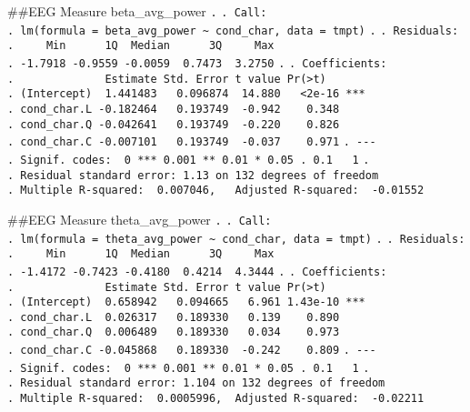 \documentclass[
]{article}
\begin{document}
\#\#EEG Measure beta\_avg\_power \texttt{.} \texttt{.\ Call:}
\texttt{.\ lm(formula\ =\ beta\_avg\_power\ \textasciitilde{}\ cond\_char,\ data\ =\ tmpt)}
\texttt{.} \texttt{.\ Residuals:}
\texttt{.\ \ \ \ \ Min\ \ \ \ \ \ 1Q\ \ Median\ \ \ \ \ \ 3Q\ \ \ \ \ Max}
\texttt{.\ -1.7918\ -0.9559\ -0.0059\ \ 0.7473\ \ 3.2750} \texttt{.}
\texttt{.\ Coefficients:}
\texttt{.\ \ \ \ \ \ \ \ \ \ \ \ \ \ Estimate\ Std.\ Error\ t\ value\ Pr(\textgreater{}\textbar{}t\textbar{})}
\texttt{.\ (Intercept)\ \ 1.441483\ \ \ 0.096874\ \ 14.880\ \ \ \textless{}2e-16\ ***}
\texttt{.\ cond\_char.L\ -0.182464\ \ \ 0.193749\ \ -0.942\ \ \ \ 0.348}
\texttt{.\ cond\_char.Q\ -0.042641\ \ \ 0.193749\ \ -0.220\ \ \ \ 0.826}
\texttt{.\ cond\_char.C\ -0.007101\ \ \ 0.193749\ \ -0.037\ \ \ \ 0.971}
\texttt{.\ -\/-\/-}
\texttt{.\ Signif.\ codes:\ \ 0\ \textquotesingle{}***\textquotesingle{}\ 0.001\ \textquotesingle{}**\textquotesingle{}\ 0.01\ \textquotesingle{}*\textquotesingle{}\ 0.05\ \textquotesingle{}.\textquotesingle{}\ 0.1\ \textquotesingle{}\ \textquotesingle{}\ 1}
\texttt{.}
\texttt{.\ Residual\ standard\ error:\ 1.13\ on\ 132\ degrees\ of\ freedom}
\texttt{.\ Multiple\ R-squared:\ \ 0.007046,\ \ \ Adjusted\ R-squared:\ \ -0.01552}

\#\#EEG Measure theta\_avg\_power \texttt{.} \texttt{.\ Call:}
\texttt{.\ lm(formula\ =\ theta\_avg\_power\ \textasciitilde{}\ cond\_char,\ data\ =\ tmpt)}
\texttt{.} \texttt{.\ Residuals:}
\texttt{.\ \ \ \ \ Min\ \ \ \ \ \ 1Q\ \ Median\ \ \ \ \ \ 3Q\ \ \ \ \ Max}
\texttt{.\ -1.4172\ -0.7423\ -0.4180\ \ 0.4214\ \ 4.3444} \texttt{.}
\texttt{.\ Coefficients:}
\texttt{.\ \ \ \ \ \ \ \ \ \ \ \ \ \ Estimate\ Std.\ Error\ t\ value\ Pr(\textgreater{}\textbar{}t\textbar{})}
\texttt{.\ (Intercept)\ \ 0.658942\ \ \ 0.094665\ \ \ 6.961\ 1.43e-10\ ***}
\texttt{.\ cond\_char.L\ \ 0.026317\ \ \ 0.189330\ \ \ 0.139\ \ \ \ 0.890}
\texttt{.\ cond\_char.Q\ \ 0.006489\ \ \ 0.189330\ \ \ 0.034\ \ \ \ 0.973}
\texttt{.\ cond\_char.C\ -0.045868\ \ \ 0.189330\ \ -0.242\ \ \ \ 0.809}
\texttt{.\ -\/-\/-}
\texttt{.\ Signif.\ codes:\ \ 0\ \textquotesingle{}***\textquotesingle{}\ 0.001\ \textquotesingle{}**\textquotesingle{}\ 0.01\ \textquotesingle{}*\textquotesingle{}\ 0.05\ \textquotesingle{}.\textquotesingle{}\ 0.1\ \textquotesingle{}\ \textquotesingle{}\ 1}
\texttt{.}
\texttt{.\ Residual\ standard\ error:\ 1.104\ on\ 132\ degrees\ of\ freedom}
\texttt{.\ Multiple\ R-squared:\ \ 0.0005996,\ \ Adjusted\ R-squared:\ \ -0.02211}
\end{document}
